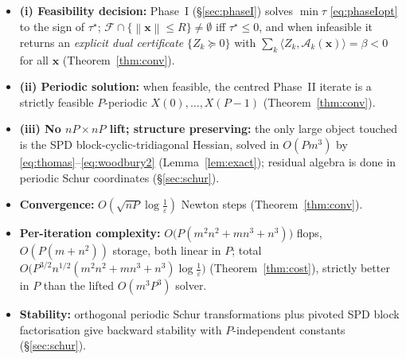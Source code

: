\documentclass{amsart}
\newcommand{\norm}[1]{\left\lVert#1\right\rVert}
\begin{document}
\begin{itemize}
\item \textbf{(i) Feasibility decision:} Phase~I (\S\ref{sec:phaseI}) solves
$\min\tau$ \eqref{eq:phaseIopt} to the sign of $\tau^\star$;
$\mathcal F\cap\{\norm{\bm x}\le R\}\neq\emptyset$ iff $\tau^\star\le0$, and when
infeasible it returns an \emph{explicit dual certificate} $\{Z_k\succeq0\}$ with
$\sum_k\langle Z_k,\mathcal A_k(\bm x)\rangle=\beta<0$ for all $\bm x$
(Theorem~\ref{thm:conv}).
\item \textbf{(ii) Periodic solution:} when feasible, the centred Phase~II iterate is
a strictly feasible $P$-periodic $X(0),\dots,X(P-1)$ (Theorem~\ref{thm:conv}).
\item \textbf{(iii) No $nP\times nP$ lift; structure preserving:} the only large
object touched is the SPD block-cyclic-tridiagonal Hessian, solved in $O(Pm^3)$ by
\eqref{eq:thomas}--\eqref{eq:woodbury2} (Lemma~\ref{lem:exact}); residual algebra is
done in periodic Schur coordinates (\S\ref{sec:schur}).
\item \textbf{Convergence:} $O(\sqrt{nP}\log\frac1\varepsilon)$ Newton steps
(Theorem~\ref{thm:conv}).
\item \textbf{Per-iteration complexity:} $O\!\big(P(m^2n^2+mn^3+n^3)\big)$ flops,
$O(P(m+n^2))$ storage, both linear in $P$; total
$O\!\big(P^{3/2}n^{1/2}(m^2n^2+mn^3+n^3)\log\frac1\varepsilon\big)$
(Theorem~\ref{thm:cost}), strictly better in $P$ than the lifted $O(m^3P^3)$ solver.
\item \textbf{Stability:} orthogonal periodic Schur transformations plus pivoted SPD
block factorisation give backward stability with $P$-independent constants
(\S\ref{sec:schur}).
\end{itemize}
\end{document}
